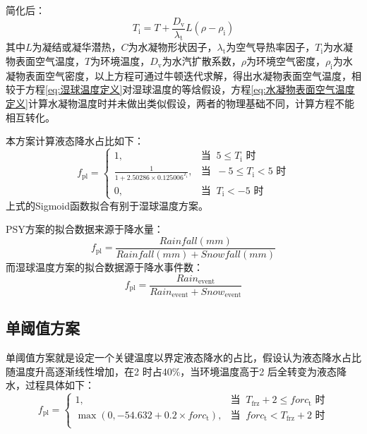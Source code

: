 简化后：
\begin{equation}
  \label{eq:水凝物表面空气温度定义}
  T_{\mathrm {i}} = T + \frac{D_{\mathrm {v}}}{\lambda_{\mathrm{t}}}L(\rho - \rho_{\mathrm {i}})
\end{equation}
%
其中$L$为凝结或凝华潜热，$C$为水凝物形状因子，$\lambda_{\mathrm {t}}$为空气导热率因子，$T_{\mathrm {i}}$为水凝物表面空气温度，$T$为环境温度，$D_{\mathrm {v}}$为水汽扩散系数，$\rho$为环境空气密度，$\rho_{\mathrm {i}}$为水凝物表面空气密度，以上方程可通过牛顿迭代求解，得出水凝物表面空气温度，相较于方程\eqref{eq:湿球温度定义}对湿球温度的等焓假设，方程\eqref{eq:水凝物表面空气温度定义}计算水凝物温度时并未做出类似假设，两者的物理基础不同，计算方程不能相互转化。

本方案计算液态降水占比如下：
\begin{equation*}
  f_{\mathrm{pl}}= \begin{cases}
    1, & \text{当 }\ 5\leqslant T_{\mathrm {i}} \text{ 时}\\
    \frac{1}{1 + 2.50286\times 0.125006^{T_{\mathrm{i}}}}, & \text{当 }\ -5\leqslant T_{\mathrm {i}} < 5 \text{ 时} \\
    0, & \text{当 }\ T_{\mathrm {i}} < -5 \text{ 时}
  \end{cases}
\end{equation*}
%
上式的Sigmoid函数拟合有别于湿球温度方案。

PSY方案的拟合数据来源于降水量：
\begin{equation}
  f_{\mathrm{pl}} = \frac{Rainfall(mm)}{Rainfall(mm) + Snowfall(mm)}
\end{equation}
%
而湿球温度方案的拟合数据源于降水事件数：
\begin{equation}
  f_{\mathrm{pl}} = \frac{Rain_{\mathrm{event}}}{Rain_{\mathrm{event}} + Snow_{\mathrm{event}}}
\end{equation}


\subsection{单阈值方案}
单阈值方案就是设定一个关键温度以界定液态降水的占比，假设认为液态降水占比随温度升高逐渐线性增加，在2 \textcelsius 时占40\%，当环境温度高于2 \textcelsius 后全转变为液态降水，过程具体如下：
\begin{equation*}
  f_{\mathrm{pl}}= \begin{cases}
    1, & \text{当 }\ T_{\mathrm{frz}}+2\leqslant forc_{\mathrm {t}} \text{ 时}\\
    \max(0,-54.632 + 0.2\times forc_{\mathrm {t}}), & \text{当 }\ forc_{\mathrm {t}} < T_{\mathrm{frz}} + 2 \text{ 时} \\
  \end{cases}
\end{equation*}


